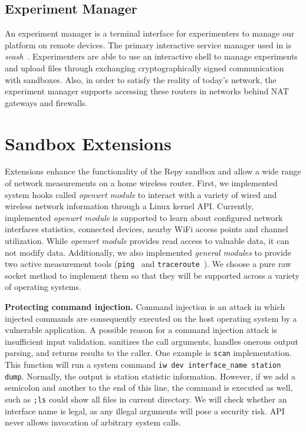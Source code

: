 \subsection{Experiment Manager}
\label{sec.seash}
An experiment manager is a terminal interface for experimenters to manage our platform on remote devices. The primary interactive service manager used in \sysname is \textit{seash}~\cite{seash}. Experimenters are able to use an interactive shell to manage experiments and upload files through exchanging cryptographically signed communication with sandboxes. Also, in order to satisfy the reality of today's network, the experiment manager supports accessing these routers in networks behind NAT gateways and firewalls.

\section{Sandbox Extensions}
\label{sec.extensions}
Extensions enhance the functionality of the Repy sandbox and allow a wide range of network measurements on a home wireless router. First, we implemented system hooks called \textit{openwrt module} to interact with a variety of wired and wireless network information through a Linux kernel API. Currently, implemented \textit{openwrt module} is supported to learn about configured network interfaces statistics, connected devices, nearby WiFi access points and channel utilization. While \textit{openwrt module} provides read access to valuable data, it can not modify data. Additionally, we also implemented \textit{general modules} to provide two active measurement tools (\texttt{ping}~\cite{pingcode} and \texttt{traceroute}~\cite{traceroutecode}). We choose a pure raw socket method to implement them so that they will be supported across a variety of operating systems. 

\textbf{Protecting command injection.} Command injection is an attack in which injected commands are consequently executed on the host operating system by a vulnerable application. A possible reason for a command injection attack is insufficient input validation. \sysname sanitizes the call arguments, handles onerous output parsing, and returns results to the caller. One example is \texttt{scan} implementation. This function will run a system command \texttt{iw dev interface\_name station dump}. Normally, the output is station statistic information. However, if we add a semicolon and another to the end of this line, the command is executed as well, such as \texttt{;ls} could show all files in current directory. We will check whether an interface name is legal, as any illegal arguments will pose a security risk. \sysname API never allows invocation of arbitrary system calls.

